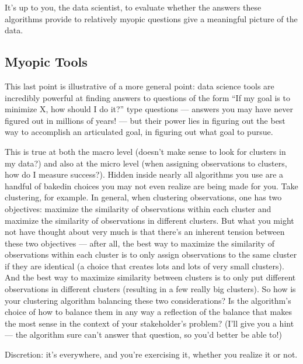 \documentclass[letterpaper,10pt,english]{jupyterBook}
\begin{document}
\sphinxAtStartPar
It’s up to you, the data scientist, to evaluate whether the answers these algorithms provide to relatively myopic questions give a meaningful picture of the data.


\subsection{Myopic Tools}
\label{\detokenize{30_questions/15_answering_exploratory_questions:myopic-tools}}
\sphinxAtStartPar
This last point is illustrative of a more general point: data science tools are incredibly powerful at finding answers to questions of the form “If my goal is to minimize X, how should I do it?” type questions — answers you may have never figured out in millions of years! — but their power lies in figuring out the best way to accomplish an articulated goal,  in figuring out what goal to pursue.

\sphinxAtStartPar
This is true at both the macro level (doesn’t make sense to look for clusters in my data?) and also at the micro level (when assigning observations to clusters, how do I measure success?). Hidden inside nearly all algorithms you use are a handful of baked\sphinxhyphen{}in choices you may not even realize are being made for you. Take clustering, for example. In general, when clustering observations, one has two objectives: maximize the similarity of observations within each cluster and maximize the similarity of observations in different clusters. But what you might not have thought about very much is that there’s an inherent tension between these two objectives — after all, the best way to maximize the similarity of observations within each cluster is to only assign observations to the same cluster if they are identical (a choice that creates lots and lots of very small clusters). And the best way to maximize similarity between clusters is to only put  different observations in different clusters (resulting in a few really big clusters). So how is your clustering algorithm balancing these two considerations? Is the algorithm’s choice of how to balance them in any way a reflection of the balance that makes the most sense in the context of your stakeholder’s problem? (I’ll give you a hint — the algorithm sure can’t answer that question, so you’d better be able to!)

\sphinxAtStartPar
Discretion: it’s everywhere, and you’re exercising it, whether you realize it or not.
\end{document}
